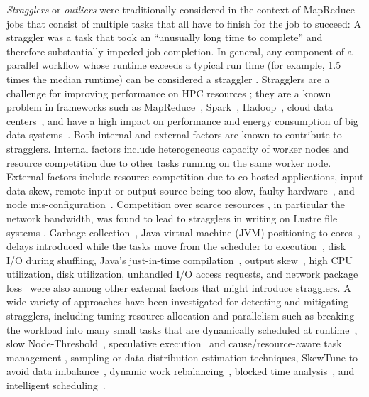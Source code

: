 \emph{Stragglers} or \emph{outliers} were traditionally considered in the context of MapReduce jobs that consist of multiple tasks that all have to finish for the job to succeed: A straggler was a task that took an ``unusually long time to complete'' \cite{Dean2008} and therefore substantially impeded job completion.
In general, any component of a parallel workflow whose runtime exceeds a typical run time (for example, 1.5 times the median runtime) can be considered a straggler \cite{Ananthanarayanan:2010aa}.
Stragglers are a challenge for improving performance on HPC resources \cite{Garraghan2016}; they are a known problem in frameworks such as MapReduce~\cite{Dean2008, Ananthanarayanan:2010aa}, Spark~\cite{Kyong2017,Ousterhout2017,Gittens2016,Yang2016}, Hadoop~\cite{Dean2008}, cloud data centers~\cite{Kirpichov2016,Garraghan2016}, and have a high impact on performance and energy consumption of big data systems~\cite{Tien-2017}.
Both internal and external factors are known to contribute to stragglers. 
Internal factors include heterogeneous capacity of worker nodes and resource competition due to other tasks running on the same worker node.
External factors include resource competition due to co-hosted applications, input data skew, remote input or output source being too slow,  faulty hardware~\cite{Chen2014,Dean2008}, and node mis-configuration~\cite{Dean2008}.
Competition over scarce resources \cite{Ananthanarayanan:2010aa}, in particular the network bandwidth, was found to lead to stragglers in writing on Lustre file systems \cite{Xie:2012aa}.
Garbage collection~\cite{Kyong2017,Ousterhout2017}, Java virtual machine (JVM) positioning to cores~\cite{Kyong2017}, delays introduced while the tasks move from the scheduler to execution~\cite{Gittens2016}, disk I/O during shuffling, Java's just-in-time compilation~\cite{Ousterhout2017}, output skew~\cite{Ousterhout2017}, high CPU utilization, disk utilization, unhandled I/O access requests, and network package loss~\cite{Garraghan2016} were also among other external factors that might introduce stragglers.
A wide variety of approaches have been investigated for detecting and mitigating stragglers, including tuning resource allocation and parallelism such as breaking the workload into many small tasks that are dynamically scheduled at runtime~\cite{Rosen2012}, slow Node-Threshold~\cite{Dean2008}, speculative execution~\cite{Dean2008} and cause/resource-aware task management \cite{Ananthanarayanan:2010aa}, sampling or data distribution estimation techniques, SkewTune to avoid data imbalance~\cite{Kwon2012}, dynamic work rebalancing~\cite{Kirpichov2016}, blocked time analysis~\cite{Ousterhout2015}, and intelligent scheduling~\cite{AWE-WQ2014}. 

